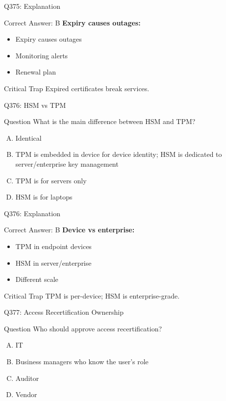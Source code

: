 \documentclass{beamer}
\begin{document}
	\begin{frame}{Q375: Explanation}
		\begin{block}{Correct Answer: B}
			\textbf{Expiry causes outages:}
			\begin{itemize}
				\item Expiry causes outages
				\item Monitoring alerts
				\item Renewal plan
			\end{itemize}
		\end{block}
		\begin{alertblock}{Critical Trap}
			Expired certificates break services.
		\end{alertblock}
	\end{frame}
	
	\begin{frame}{Q376: HSM vs TPM}
		\begin{block}{Question}
			What is the main difference between HSM and TPM?
		\end{block}
		\begin{enumerate}[(A)]
			\item Identical
			\item TPM is embedded in device for device identity; HSM is dedicated to server/enterprise key management
			\item TPM is for servers only
			\item HSM is for laptops
		\end{enumerate}
	\end{frame}
	
	\begin{frame}{Q376: Explanation}
		\begin{block}{Correct Answer: B}
			\textbf{Device vs enterprise:}
			\begin{itemize}
				\item TPM in endpoint devices
				\item HSM in server/enterprise
				\item Different scale
			\end{itemize}
		\end{block}
		\begin{alertblock}{Critical Trap}
			TPM is per-device; HSM is enterprise-grade.
		\end{alertblock}
	\end{frame}
	
	\begin{frame}{Q377: Access Recertification Ownership}
		\begin{block}{Question}
			Who should approve access recertification?
		\end{block}
		\begin{enumerate}[(A)]
			\item IT
			\item Business managers who know the user's role
			\item Auditor
			\item Vendor
		\end{enumerate}
	\end{frame}
	
\end{document}
